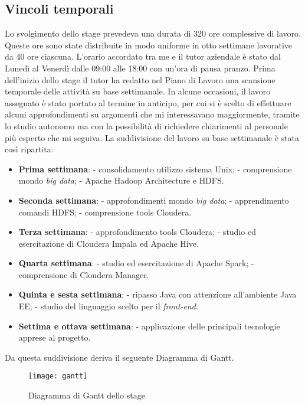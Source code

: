 \subsection{Vincoli temporali} \label{pdl}
Lo svolgimento dello stage prevedeva una durata di 320 ore complessive di lavoro. Queste ore sono state distribuite in modo uniforme in otto settimane lavorative da 40 ore ciascuna. L'orario accordato tra me e il tutor aziendale è stato dal Lunedì al Venerdì dalle 09:00 alle 18:00 con un'ora di pausa pranzo. Prima dell'inizio dello stage il tutor ha redatto nel Piano di Lavoro una scansione temporale delle attività su base settimanale.
In alcune occasioni, il lavoro assegnato è stato portato al termine in anticipo, per cui si è scelto di effettuare alcuni approfondimenti su argomenti che mi interessavano maggiormente, tramite lo studio autonomo ma con la possibilità di richiedere chiarimenti al personale più esperto che mi seguiva.
La suddivisione del lavoro su base settimanale è stata così ripartita:
\begin{itemize}
	\item \textbf{Prima settimana}: 
		\subitem - consolidamento utilizzo sistema Unix;
		\subitem - comprensione mondo \textit{big data};
		\subitem - Apache Hadoop Architecture e \gls{HDFS}.
	\item \textbf{Seconda settimana}:
		\subitem - approfondimenti mondo \textit{big data};
		\subitem - apprendimento comandi \gls{HDFS};
		\subitem - comprensione tools Cloudera.
	\item \textbf{Terza settimana}:
		\subitem - approfondimento tools Cloudera;
		\subitem - studio ed esercitazione di Cloudera Impala ed Apache Hive.
	\item \textbf{Quarta settimana}:
		\subitem - studio ed esercitazione di Apache Spark;
		\subitem - comprensione di Cloudera Manager.
	\item \textbf{Quinta e sesta settimana}:
	 	\subitem - ripasso Java con attenzione all'ambiente Java EE;
	 	\subitem - studio del linguaggio scelto per il \textit{front-end}.
	\item \textbf{Settima e ottava settimana}:
		\subitem - applicazione delle principali tecnologie apprese al progetto.
\end{itemize}
Da questa suddivisione deriva il seguente \gls{Diagramma di Gantt}.
\begin{figure}[!h] 
	\centering 
	\texttt{[image: gantt]}
	\caption{Diagramma di Gantt dello stage}
\end{figure}

